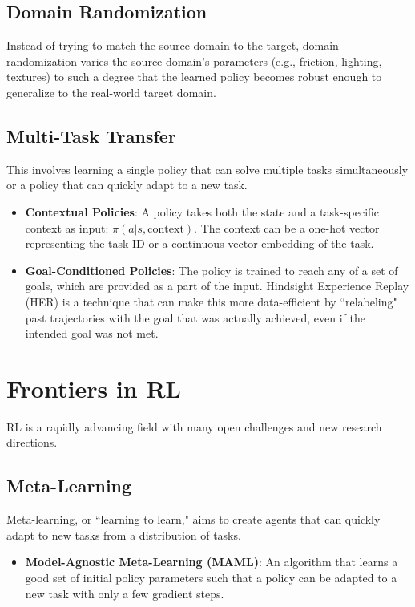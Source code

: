 \documentclass[12pt]{article}
\begin{document}
\subsection{Domain Randomization}
Instead of trying to match the source domain to the target, domain randomization varies the source domain's parameters (e.g., friction, lighting, textures) to such a degree that the learned policy becomes robust enough to generalize to the real-world target domain.

\subsection{Multi-Task Transfer}
This involves learning a single policy that can solve multiple tasks simultaneously or a policy that can quickly adapt to a new task.
\begin{itemize}
    \item \textbf{Contextual Policies}: A policy takes both the state and a task-specific context as input: $\pi(a|s, \text{context})$. The context can be a one-hot vector representing the task ID or a continuous vector embedding of the task.
    \item \textbf{Goal-Conditioned Policies}: The policy is trained to reach any of a set of goals, which are provided as a part of the input. Hindsight Experience Replay (HER) is a technique that can make this more data-efficient by ``relabeling" past trajectories with the goal that was actually achieved, even if the intended goal was not met.
\end{itemize}

\section{Frontiers in RL }
RL is a rapidly advancing field with many open challenges and new research directions.

\subsection{Meta-Learning}
Meta-learning, or ``learning to learn," aims to create agents that can quickly adapt to new tasks from a distribution of tasks.
\begin{itemize}
    \item \textbf{Model-Agnostic Meta-Learning (MAML)}: An algorithm that learns a good set of initial policy parameters such that a policy can be adapted to a new task with only a few gradient steps.
\end{itemize}
\end{document}
